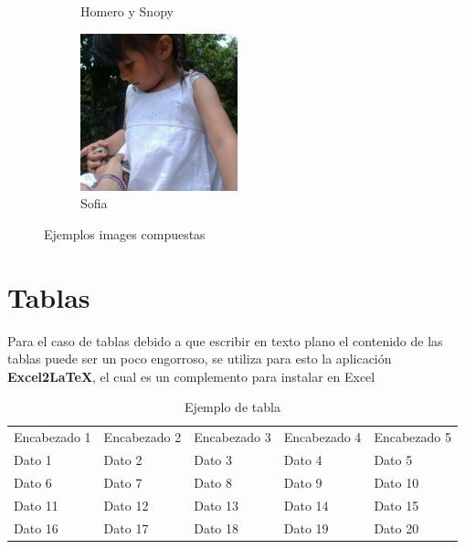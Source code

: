 \documentclass{article}
\begin{document}
\begin{enumerate}
\begin{figure}[h!]
\begin{subfigure}{0.5\textwidth}
		\caption{Homero y Snopy}
		\label{homeroSnoopy}		
	\end{subfigure}
	\begin{subfigure}{0.5\textwidth}
		\centering
		\includegraphics[width = 0.5\textwidth]{Imagenes/Sofia.jpg}
		\caption{Sofia}
		\label{Sofia}		
	\end{subfigure}

	\caption{Ejemplos images compuestas}
	\label{FiguraVarias}
	
\end{figure}

\newpage

\section{Tablas}

Para el caso de tablas debido a que escribir en texto plano el contenido de las tablas
puede ser un poco engorroso, se utiliza para esto la aplicación \textbf{Excel2LaTeX}, el cual es un complemento para
instalar en Excel \cite{TalasExcel}

\begin{table}[htbp]
	\centering
	\caption{Ejemplo de tabla}
	  \begin{tabular}{lllll}
	  Encabezado 1 & Encabezado 2 & Encabezado 3 & Encabezado 4 & Encabezado 5 \\
	  Dato 1 & Dato 2 & Dato 3 & Dato 4 & Dato 5 \\
	  Dato 6 & Dato 7 & Dato 8 & Dato 9 & Dato 10 \\
	  Dato 11 & Dato 12 & \cellcolor[rgb]{ 1,  1,  0}Dato 13 & Dato 14 & Dato 15 \\
	  Dato 16 & Dato 17 & Dato 18 & Dato 19 & Dato 20 \\
	  \end{tabular}%
	\label{PrimerTablaEjemplo}%
  \end{table}%


\end{enumerate}
\end{document}
